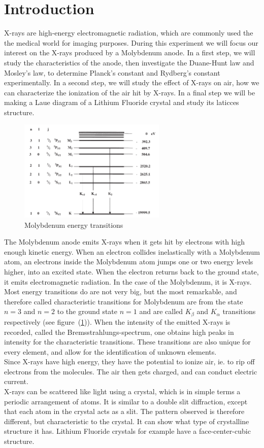 \documentclass{scrartcl}
\begin{document}
\section{Introduction}
X-rays are high-energy electromagnetic radiation, which are commonly used the the medical world for imaging purposes. During this experiment we will focus our interest on the X-rays produced by a Molybdenum anode. In a first step, we will study the characteristics of the anode, then investigate the Duane-Hunt law and Mosley's law, to determine Planck's constant and Rydberg's constant experimentally. In a second step, we will study the effect of X-rays on air, how we can characterize the ionization of the air hit by X-rays. In a final step we will be making a Laue diagram of a Lithium Fluoride crystal and study its laticces structure.\\ \begin{figure}
    \centering
    \includegraphics[width=7cm]{MolybdenumEnergyTransitions.png}
    \caption{Molybdenum energy transitions}
    \label{fig:molybdenumEnergyTransitions}
\end{figure} The Molybdenum anode emits X-rays when it gets hit by electrons with high enough kinetic energy. When an electron collides inelastically with a Molybdenum atom, an electrons inside the Molybdenum atom jumps one or two energy levels higher, into an excited state. When the electron returns back to the ground state, it emits electromagnetic radiation. In the case of the Molybdenum, it is X-rays. Most energy transitions do are not very big, but the most remarkable, and therefore called characteristic transitions for Molybdenum are from the state $n=3$ and $n=2$ to the ground state $n=1$ and are called $K_{\beta}$ and $K_{\alpha}$ transitions respectively (see figure~(\ref{fig:molybdenumEnergyTransitions})). When the intensity of the emitted X-rays is recorded, called the Bremsstrahlungs-spectrum, one obtains high peaks in intensity for the characteristic transitions. These transitions are also unique for every element, and allow for the identification of unknown elements. \\ Since X-rays have high energy, they have the potential to ionize air, ie. to rip off electrons from the molecules. The air then gets charged, and can conduct electric current. \\ X-rays can be scattered like light using a crystal, which is in simple terms a periodic arrangement of atoms. It is similar to a double slit diffraction, except that each atom in the crystal acts as a slit. The pattern observed is therefore different, but characteristic to the crystal. It can show what type of crystalline structure it has. Lithium Fluoride crystals for example have a face-center-cubic structure.
\end{document}
